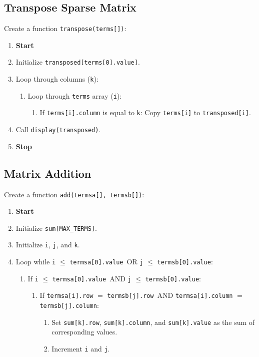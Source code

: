 {  \subsection{Transpose Sparse Matrix}
  Create a function \texttt{transpose(terms[])}:
  \begin{enumerate}
    \item \textbf{Start}
    \item Initialize \texttt{transposed[terms[0].value]}.
    \item Loop through columns (\texttt{k}):
          \begin{enumerate}[label=2.\arabic*:]
            \item Loop through \texttt{terms} array (\texttt{i}):
                  \begin{enumerate}[label=2.1.\arabic*:]
                    \item If \texttt{terms[i].column} is equal to \texttt{k}:
                          Copy \texttt{terms[i]} to \texttt{transposed[i]}.
                  \end{enumerate}
          \end{enumerate}
    \item Call \texttt{display(transposed)}.
    \item \textbf{Stop}
  \end{enumerate}

  \subsection{Matrix Addition}
  Create a function \texttt{add(termsa[], termsb[])}:
  \begin{enumerate}[label=\arabic*:,left=0pt]
    \item \textbf{Start}
    \item Initialize \texttt{sum[MAX\_TERMS]}.
    \item Initialize \texttt{i}, \texttt{j}, and \texttt{k}.
    \item Loop while \texttt{i} $\leq$ \texttt{termsa[0].value}\ OR \texttt{j} $\leq$ \texttt{termsb[0].value}:
          \begin{enumerate}[label=4.\arabic*:]
            \item If \texttt{i} $\leq$ \texttt{termsa[0].value}\ AND \texttt{j} $\leq$ \texttt{termsb[0].value}:
                  \begin{enumerate}[label=4.1.\arabic*:]
                    \item If \texttt{termsa[i].row} $=$ \texttt{termsb[j].row}\ AND \texttt{termsa[i].column} $=$ \texttt{termsb[j].column}:
                          \begin{enumerate}[label=4.1.1.\arabic*:]
                            \item Set \texttt{sum[k].row}, \texttt{sum[k].column}, and \texttt{sum[k].value} as the sum of corresponding \newline values.
                            \item Increment \texttt{i} and \texttt{j}.
                          \end{enumerate}


\end{enumerate}
\end{enumerate}
\end{enumerate}}

